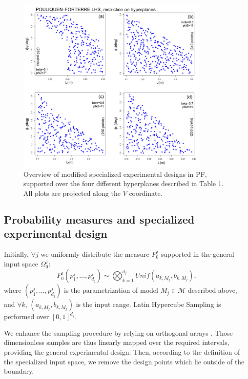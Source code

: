 \documentclass[nhess, manuscript]{copernicus}
\begin{document}
\begin{figure}[H]
\centering
\includegraphics[width=0.85\textwidth]{FigA1.png}
\caption{Overview of modified specialized experimental designs in PF, supported over the four different hyperplanes described in Table 1. All plots are projected along the $V$ coordinate.}
\label{FigA1}
\end{figure}

\subsection{Probability measures and specialized experimental design}
Initially, $\forall j$ we uniformly distribute the measure $P_0^j$ supported in the general input space $\Omega_0^j$:
\begin{equation}
P_0^j\left(p^j_1,\dots,p^j_{d_j}\right)\sim \bigotimes_{k=1}^{d_j} Unif(a_{k,{M_j}},b_{k,{M_j}}),
\end{equation}
where $(p^j_1,\dots,p^j_{d_j})$ is the parametrization of model $M_j\in\mathcal M$ described above, and $\forall k$, $\left(a_{k,{M_j}},b_{k,{M_j}}\right)$ is the input range. Latin Hypercube Sampling is performed over $[0,1]^{d_j}$.

We enhance the sampling procedure by relying on orthogonal arrays \citep{Owen1992a,Tang1993, Patra2018}. Those dimensionless samples are thus linearly  mapped over the required intervals, providing the general experimental design. Then, according to the definition of the specialized input space, we remove the design points which lie outside of the boundary.
\end{document}
